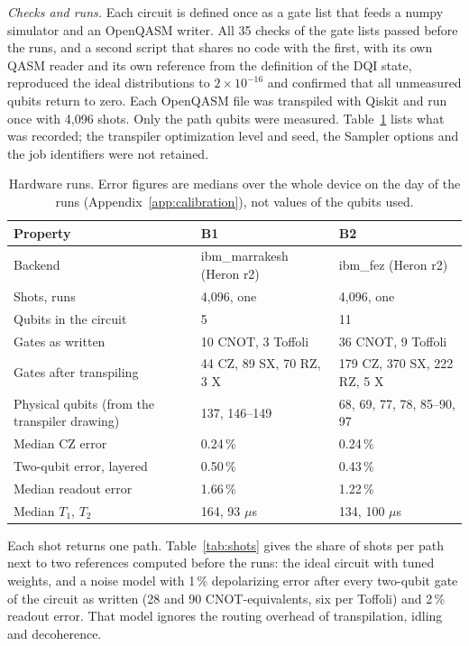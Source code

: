 \documentclass[journal]{IEEEtran}
\begin{document}
\emph{Checks and runs.} Each circuit is defined once as a gate list that feeds a numpy simulator and an OpenQASM writer. All 35 checks of the gate lists passed before the runs, and a second script that shares no code with the first, with its own QASM reader and its own reference from the definition of the DQI state, reproduced the ideal distributions to $2\times10^{-16}$ and confirmed that all unmeasured qubits return to zero. Each OpenQASM file was transpiled with Qiskit and run once with 4{,}096 shots. Only the path qubits were measured. Table~\ref{tab:hardware} lists what was recorded; the transpiler optimization level and seed, the Sampler options and the job identifiers were not retained.

\begin{table}[t]
\caption{Hardware runs. Error figures are medians over the whole device on the day of the runs (Appendix~\ref{app:calibration}), not values of the qubits used.}
\label{tab:hardware}
\centering
\footnotesize
\setlength{\tabcolsep}{3pt}
\begin{tabular}{p{}p{}p{}}
\hline \hline
\textbf{Property} & \textbf{B1} & \textbf{B2} \\
\hline
Backend & ibm\_marrakesh (Heron r2) & ibm\_fez (Heron r2) \\
Shots, runs & 4{,}096, one & 4{,}096, one \\
Qubits in the circuit & 5 & 11 \\
Gates as written & 10 CNOT, 3 Toffoli & 36 CNOT, 9 Toffoli \\
Gates after transpiling & 44 CZ, 89 SX, 70 RZ, 3 X & 179 CZ, 370 SX, 222 RZ, 5 X \\
Physical qubits (from the transpiler drawing) & 137, 146--149 & 68, 69, 77, 78, 85--90, 97 \\
Median CZ error & 0.24\,\% & 0.24\,\% \\
Two-qubit error, layered & 0.50\,\% & 0.43\,\% \\
Median readout error & 1.66\,\% & 1.22\,\% \\
Median $T_{1}$, $T_{2}$ & 164, 93 $\mu$s & 134, 100 $\mu$s \\
\hline \hline
\end{tabular}
\end{table}

Each shot returns one path. Table~\ref{tab:shots} gives the share of shots per path next to two references computed before the runs: the ideal circuit with tuned weights, and a noise model with 1\,\% depolarizing error after every two-qubit gate of the circuit as written (28 and 90 CNOT-equivalents, six per Toffoli) and 2\,\% readout error. That model ignores the routing overhead of transpilation, idling and decoherence.
\end{document}
